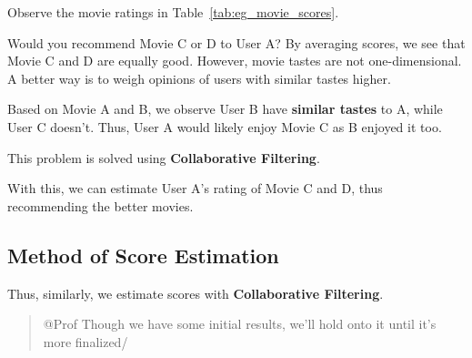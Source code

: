 Observe the movie ratings in Table~\ref{tab:eg_movie_scores}.

Would you recommend Movie C or D to User A?
By averaging scores, we see that Movie C and D are equally good.
However, movie tastes are not one-dimensional.
A better way is to weigh opinions of users with similar tastes higher.

Based on Movie A and B, we observe User B have \textbf{similar tastes} to A, while User C doesn't.
Thus, User A would likely enjoy Movie C as B enjoyed it too.

This problem is solved using \textbf{Collaborative Filtering}.

With this, we can estimate User A's rating of Movie C and D, thus recommending the better movies.

\subsection{Method of Score Estimation}

Thus, similarly, we estimate scores with \textbf{Collaborative Filtering}.

\begin{quote}
    @Prof Though we have some initial results, we'll hold onto it until it's more finalized/
\end{quote}
